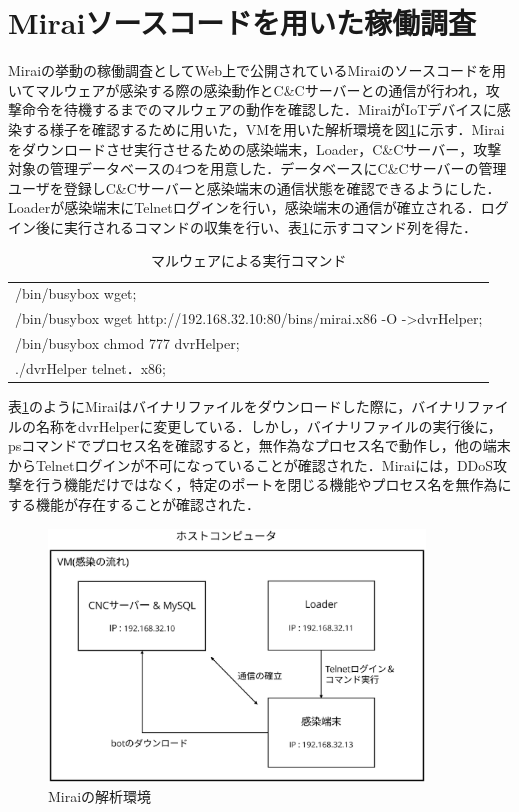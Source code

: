 \section{Miraiソースコードを用いた稼働調査}
Miraiの挙動の稼働調査としてWeb上で公開されているMiraiのソースコード\cite{code}を用いてマルウェアが感染する際の感染動作とC\&Cサーバーとの通信が行われ，攻撃命令を待機するまでのマルウェアの動作を確認した．MiraiがIoTデバイスに感染する様子を確認するために用いた，VMを用いた解析環境を図\ref{fig:kaiseki}に示す．Miraiをダウンロードさせ実行させるための感染端末，Loader，C\&Cサーバー，攻撃対象の管理データベースの4つを用意した．データベースにC\&Cサーバーの管理ユーザを登録しC\&Cサーバーと感染端末の通信状態を確認できるようにした．Loaderが感染端末にTelnetログインを行い，感染端末の通信が確立される．ログイン後に実行されるコマンドの収集を行い、表\ref{tab:malware}に示すコマンド列を得た．
\begin{table}[t]
   \caption{マルウェアによる実行コマンド}
   \label{tab:malware}
   \centering
\begin{tabular}{p{7cm}}
\hline
/bin/busybox wget;\\
/bin/busybox wget http://192.168.32.10:80/bins/mirai.x86 -O -\textgreater dvrHelper;\\
/bin/busybox chmod 777 dvrHelper;\\
./dvrHelper telnet．x86;\\
\hline
\end{tabular}
\end{table}
表\ref{tab:malware}のようにMiraiはバイナリファイルをダウンロードした際に，バイナリファイルの名称をdvrHelperに変更している．しかし，バイナリファイルの実行後に，psコマンドでプロセス名を確認すると，無作為なプロセス名で動作し，他の端末からTelnetログインが不可になっていることが確認された．Miraiには，DDoS攻撃を行う機能だけではなく，特定のポートを閉じる機能やプロセス名を無作為にする機能が存在することが確認された．
 \begin{figure}[h]
 \centering
    \includegraphics[width=100mm]{figures/VM.eps}
    \caption{Miraiの解析環境}
 \label{fig:kaiseki}
 \end{figure}
 \newpage


